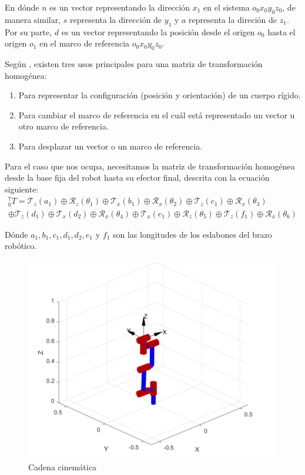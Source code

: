 En dónde $n$ es un vector representando la dirección $x_1$ en el sistema $o_0 x_0 y_0 z_0$, de manera similar, $s$ representa la dirección de $y_1$ y $a$ representa la direción de $z_1$. Por su parte, $d$ es un vector representando la posición desde el origen $o_0$ hasta el origen $o_1$ en el marco de referencia $o_0 x_0 y_0 z_0$.


Según \cite{University2017}, existen tres usos principales para una matriz de transformación homogénea:

\begin{enumerate}
\itemsep0em
  \item Para representar la configuración (posición y orientación) de un cuerpo rígido.
  \item Para cambiar el marco de referencia en el cuál está representado un vector u otro marco de referencia.
  \item Para desplazar un vector o un marco de referencia.
\end{enumerate}

Para el caso que nos ocupa, necesitamos la matriz de transformación homogénea desde la base fija del robot hasta su efector final, descrita con la ecuación siguiente:
\begin{equation}
\label{eq:homogeneustransformationmatrix}
\begin{split}
{}_{0}^{7}T = \mathscr{T}_z(a_1)\oplus\mathscr{R}_z(\theta_1)\oplus\mathscr{T}_x(b_1)\oplus\mathscr{R}_x(\theta_2)\oplus\mathscr{T}_z(c_1)\oplus\mathscr{R}_x(\theta_3) \\ \oplus\mathscr{T}_z(d_1)\oplus\mathscr{T}_x(d_2)\oplus\mathscr{R}_x(\theta_4)\oplus\mathscr{T}_x(e_1)\oplus\mathscr{R}_z(\theta_5)\oplus\mathscr{T}_z(f_1)\oplus\mathscr{R}_x(\theta_6)
\end{split}
\end{equation}

Dónde $a_1, b_1, c_1, d_1, d_2, e_1$ y $f_1$ son las longitudes de los eslabones del brazo robótico. 

\begin{figure}
    \centering
    \includegraphics[scale=0.6]{./img/chapter3/KinematicDiagramML.png}
    \caption{Cadena cinemática}
    \label{fig:kinematicchain}
\end{figure}


